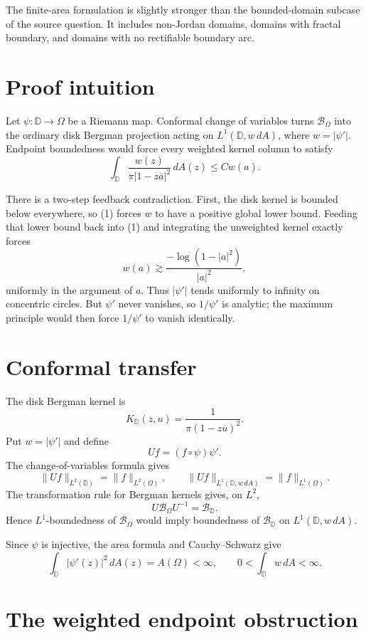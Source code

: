 \documentclass[11pt]{article}
\newcommand{\D}{\mathbb D}
\newcommand{\Berg}{\mathcal B}
\begin{document}
The finite-area formulation is slightly stronger than the bounded-domain
subcase of the source question.  It includes non-Jordan domains, domains with
fractal boundary, and domains with no rectifiable boundary arc.

\section*{Proof intuition}

Let $\psi:\D\to\Omega$ be a Riemann map.  Conformal change of variables
turns $\Berg_\Omega$ into the ordinary disk Bergman projection acting on
$L^1(\D,w\,dA)$, where $w=|\psi'|$.  Endpoint boundedness would force every
weighted kernel column to satisfy
\[
  \int_{\D}\frac{w(z)}{\pi|1-z\overline a|^2}\,dA(z)
  \le Cw(a).                                             \tag{1}
\]

There is a two-step feedback contradiction.  First, the disk kernel is
bounded below everywhere, so (1) forces $w$ to have a positive global lower
bound.  Feeding that lower bound back into (1) and integrating the unweighted
kernel exactly forces
\[
  w(a)\gtrsim \frac{-\log(1-|a|^2)}{|a|^2},
\]
uniformly in the argument of $a$.  Thus $|\psi'|$ tends uniformly to infinity
on concentric circles.  But $\psi'$ never vanishes, so $1/\psi'$ is analytic;
the maximum principle would then force $1/\psi'$ to vanish identically.

\section*{Conformal transfer}

The disk Bergman kernel is
\[
  K_{\D}(z,u)=\frac{1}{\pi(1-z\overline u)^2}.
\]
Put $w=|\psi'|$ and define
\[
  Uf=(f\circ\psi)\psi'.
\]
The change-of-variables formula gives
\[
  \|Uf\|_{L^2(\D)}=\|f\|_{L^2(\Omega)},
  \qquad
  \|Uf\|_{L^1(\D,w\,dA)}=\|f\|_{L^1(\Omega)}.          \tag{2}
\]
The transformation rule for Bergman kernels gives, on $L^2$,
\[
  U\Berg_\Omega U^{-1}=\Berg_{\D}.                     \tag{3}
\]
Hence $L^1$-boundedness of $\Berg_\Omega$ would imply boundedness of
$\Berg_{\D}$ on $L^1(\D,w\,dA)$.

Since $\psi$ is injective, the area formula and Cauchy--Schwarz give
\[
  \int_{\D}|\psi'(z)|^2\,dA(z)=A(\Omega)<\infty,
  \qquad
  0<\int_{\D}w\,dA<\infty.                             \tag{4}
\]

\section*{The weighted endpoint obstruction}
\end{document}
